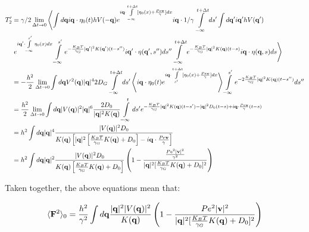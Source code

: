 \documentclass[amsmath,preprintnumbers,10pt,article,notitlepage]{revtex4-1}
\begin{document}
\begin{align}
T_2' & =  \gamma/2   \lim_{\Delta t \to 0}  \left \langle \int d{\bf q}  i{\bf q} \cdot \eta_0(t)   h V(-{\bf q}) e^{i{\bf q} \cdot \int\limits_{-\infty}^{t+\Delta t}  [ \eta_0(x) + \frac{Pe{\bf v}}{\gamma}] dx}  i{\bf q}  \cdot  1/\gamma \int\limits_{-\infty}^{t+\Delta t} ds' \int d{\bf q}' i{\bf q'}  h V({ \bf q}') \right. \\
& \left. e^{i{\bf q}' \cdot \int\limits_{-\infty}^{s'} \eta_0(x)dx} \int\limits_{-\infty}^{s'} e^{-\frac{K_BT}{\gamma_G} |{\bf q}'|^2 K({\bf q'})(t-s'')} i{\bf q}' \cdot \eta({\bf q'}, s'') ds''  \int\limits_{-\infty}^{t+\Delta t} e^{-\frac{K_BT}{\gamma_G}|{\bf q}|^2 K({\bf q})(t-s)} i{\bf q} \cdot \eta({\bf q}, s) ds\right \rangle \\
& = -\frac{h^2}{2}   \lim_{\Delta t \to 0} \int d{\bf q}   V^2({\bf q})  |{\bf q}|^4 2D_G \int\limits_{-\infty}^{t+\Delta t} ds'  \left \langle  i{\bf q} \cdot \eta_0(t) e^{i{\bf q} \cdot \int\limits_{s'}^{t+\Delta t}  [ \eta_0(x) + \frac{Pe{\bf v}}{\gamma}] dx} \right \rangle \int\limits_{-\infty}^{s'} e^{-2\frac{K_BT}{\gamma_G} |{\bf q}|^2 K({\bf q})(t-s'')} ds'' \\
& = \frac{h^2}{2}   \lim_{\Delta t \to 0} \int d{\bf q}  |V({\bf q})|^2 |{\bf q}|^6 \dfrac{2D_0}{|{\bf q}|^2 K({\bf q})}  \int\limits_{-\infty}^{t} ds' e^{-\frac{K_BT}{\gamma_G} |{\bf q}|^2 K({\bf q})(t-s') - |{\bf q}|^2 D_0(t-s) + i{\bf q} \cdot \frac{Pe{\bf v}}{\gamma}(t-s)} \\
& = h^2 \int d{\bf q} |{\bf q}|^4  \dfrac{|V({\bf q})|^2 D_0}{K({\bf q})\left[ |{\bf q}|^2 \left[ \frac{K_BT}{\gamma_G} K({\bf q}) + D_0\right] - i {\bf q} \cdot \frac{Pe{\bf v}}{\gamma} \right] }    \\
& = h^2  \int d{\bf q} |{\bf q}|^2  \dfrac{ |V({\bf q})|^2 D_0}{  K({\bf q}) \left[ \frac{K_BT}{\gamma_G} K({\bf q}) + D_0 \right ]} \left( 1 -  \dfrac{ \frac{Pe^2 |{\bf v}|^2}{\gamma^2}}{|{\bf q}|^2 [\frac{K_BT}{\gamma_G} K({\bf q}) + D_0 ]^2 } \right)    \\
\label{eq:NoiseForceT2Driven}
\end{align}

Taken together, the above equations mean that:


\begin{equation}
\langle {\bf F}^2 \rangle_0 = \dfrac{h^2}{\gamma^2} \int d{\bf q} \dfrac{ |{\bf q}|^2 |V({\bf q})|^2}{K({\bf q})} \left( 1 - \dfrac{Pe^2 |{\bf v}|^2}{ |{\bf q}|^2 [\frac{K_BT}{\gamma_G} K({\bf q}) + D_0 ]^2} \right) 
\label{eq:FSqZero}
\end{equation}
\end{document}
